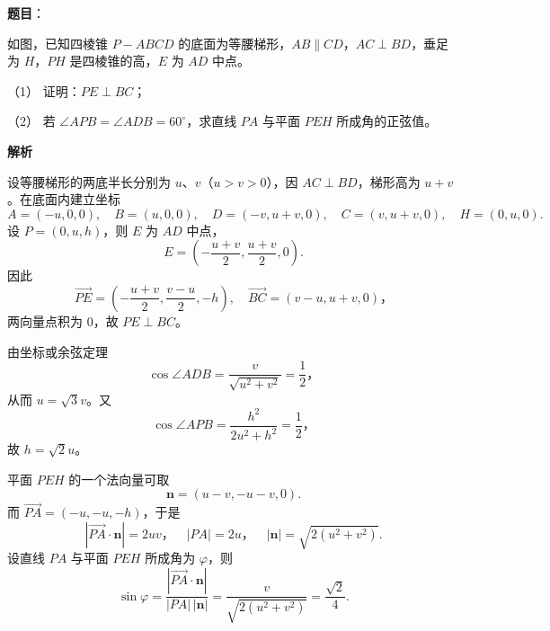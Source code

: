 \begin{answer}

\textbf{题目}：

如图，已知四棱锥 $P-ABCD$ 的底面为等腰梯形，$AB\parallel CD$，$AC\perp BD$，垂足为 $H$，$PH$ 是四棱锥的高，$E$ 为 $AD$ 中点。
\nopagebreak[4]
\begin{center}\end{center}
\nopagebreak[4]
（1） 证明：$PE\perp BC$；

（2） 若 $\angle APB=\angle ADB=60^\circ$，求直线 $PA$ 与平面 $PEH$ 所成角的正弦值。

\textbf{解析}


设等腰梯形的两底半长分别为 $u\text{、}v$（$u>v>0$），因 $AC\perp BD$，梯形高为 $u+v$。在底面内建立坐标
\nopagebreak[4]
\[
A=(-u,0,0),\quad B=(u,0,0),\quad
D=(-v,u+v,0),\quad C=(v,u+v,0),\quad H=(0,u,0).
\]
设 $P=(0,u,h)$，则 $E$ 为 $AD$ 中点，
\nopagebreak[4]
\[
E=\left(-\frac{u+v}{2},\frac{u+v}{2},0\right).
\]
因此
\nopagebreak[4]
\[
\overrightarrow{PE}=\left(-\frac{u+v}{2},\frac{v-u}{2},-h\right),\quad
\overrightarrow{BC}=(v-u,u+v,0)\text{，}
\]
两向量点积为 $0$，故 $PE\perp BC$。


由坐标或余弦定理
\nopagebreak[4]
\[
\cos\angle ADB=\frac{v}{\sqrt{u^2+v^2}}=\frac12\text{，}
\]
从而 $u=\sqrt3v$。又
\nopagebreak[4]
\[
\cos\angle APB=\frac{h^2}{2u^2+h^2}=\frac12\text{，}
\]
故 $h=\sqrt2u$。

平面 $PEH$ 的一个法向量可取
\nopagebreak[4]
\[
\boldsymbol n=(u-v,-u-v,0).
\]
而 $\overrightarrow{PA}=(-u,-u,-h)$，于是
\nopagebreak[4]
\[
|\overrightarrow{PA}\cdot\boldsymbol n|=2uv\text{，}
\quad |PA|=2u\text{，}
\quad |\boldsymbol n|=\sqrt{2(u^2+v^2)}.
\]
设直线 $PA$ 与平面 $PEH$ 所成角为 $\varphi$，则
\nopagebreak[4]
\[
\sin\varphi=\frac{|\overrightarrow{PA}\cdot\boldsymbol n|}{|PA|\,|\boldsymbol n|}
=\frac{v}{\sqrt{2(u^2+v^2)}}=\frac{\sqrt2}{4}.
\]



\end{answer}
